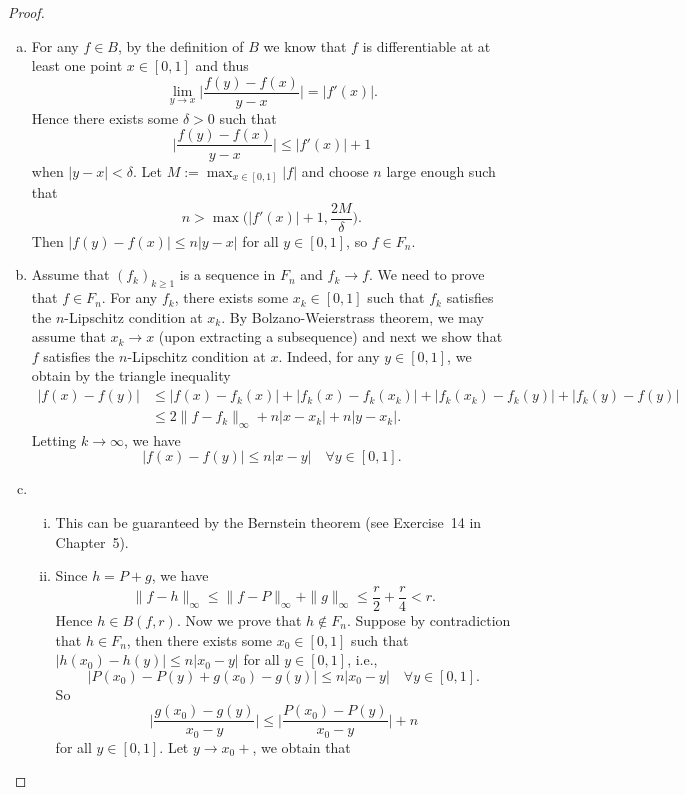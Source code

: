 \begin{proof}
  \begin{enumerate}[(a)]
    \item For any $f\in B$, by the definition of $B$ we know that $f$ is differentiable
      at at least one point $x\in [0,1]$ and thus
      \[\lim_{y\to x} \biggl|\frac{f(y)-f(x)}{y-x}\biggr| = |f'(x)|.\]
      Hence there exists some $\delta>0$ such that
      \[\biggl|\frac{f(y)-f(x)}{y-x}\biggr| \leq |f'(x)| + 1\]
      when $|y - x| < \delta$.
      Let $M := \max_{x\in [0,1]} |f|$ and choose $n$ large enough such that
      \[n > \max\biggl(|f'(x)|+1, \frac{2M}{\delta}\biggr).\]
      Then $|f(y)-f(x)| \leq n |y-x|$ for all $y\in [0,1]$, so $f\in F_n$.
    \item Assume that $(f_k)_{k\geq 1}$ is a sequence in $F_n$ and $f_k\to f$.
      We need to prove that $f\in F_n$. For any $f_k$, there exists some $x_k\in [0,1]$
      such that $f_k$ satisfies the $n$-Lipschitz condition at $x_k$.
      By Bolzano-Weierstrass theorem, we may assume that $x_k\to x$
      (upon extracting a subsequence) and next we show that $f$ satisfies the
      $n$-Lipschitz condition at $x$. Indeed, for any $y\in [0,1]$,
      we obtain by the triangle inequality
      \begin{align*}
        |f(x)-f(y)|
        & \leq |f(x)-f_k(x)| + |f_k(x)-f_k(x_k)| + |f_k(x_k)-f_k(y)| + |f_k(y)-f(y)| \\
        & \leq 2\|f-f_k\|_\infty + n|x-x_k| + n|y-x_k|.
      \end{align*}
      Letting $k\to\infty$, we have
      \[|f(x)-f(y)| \leq n|x-y|\quad \forall y\in [0,1].\]
    \item 
      \begin{enumerate}[(i)]
        \item This can be guaranteed by the Bernstein theorem (see Exercise~14 in Chapter~5).
        \item Since $h = P + g$, we have
          \[\|f - h\|_\infty \leq \|f - P\|_\infty + \|g\|_\infty \leq \frac{r}{2} + \frac{r}{4}
            < r.\]
          Hence $h\in B(f,r)$. Now we prove that $h\notin F_n$.
          Suppose by contradiction that $h\in F_n$, then there exists some $x_0\in [0,1]$
          such that $|h(x_0)-h(y)| \leq n|x_0-y|$ for all $y\in [0,1]$, i.e.,
          \[|P(x_0) - P(y) + g(x_0) - g(y)| \leq n|x_0-y| \quad \forall y\in [0,1].\]
          So
          \[\biggl|\frac{g(x_0)-g(y)}{x_0-y}\biggr| \leq
            \biggl|\frac{P(x_0)-P(y)}{x_0-y}\biggr| + n\]
          for all $y\in [0,1]$. Let $y\to x_0+$, we obtain that

\end{enumerate}
\end{enumerate}
\end{proof}
